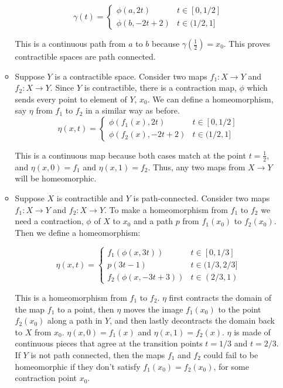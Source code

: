 \documentclass[12pt]{report}
\begin{document}
\begin{enumerate}
\begin{itemize}
  \[ \gamma(t) = \begin{cases}
  \phi(a,2t) & t \in [0,1/2] \\
  \phi(b,-2t+2) & t \in (1/2,1]
  \end{cases} \]

  This is a continuous path from $a$ to $b$ because $\gamma(\frac{1}{2}) = x_0$. This proves contractible spaces are
  path connected.

  \item Suppose $Y$ is a contractible space. Consider two maps $f_1: X \to Y$ and $f_2: X \to Y$. Since $Y$ is
  contractible, there is a contraction map, $\phi$ which sends every point to element of $Y$, $x_0$. We can define a
  homeomorphism, say $\eta$ from $f_1$ to $f_2$ in a similar way as before.
  \[ \eta(x,t) = \begin{cases}
  \phi(f_1(x),2t) & t \in [0,1/2] \\
  \phi(f_2(x),-2t+2) & t \in (1/2,1]
  \end{cases} \]

  This is a continuous map because both cases match at the point $t = \frac{1}{2}$, and $\eta(x,0) = f_1$ and
  $\eta(x,1) = f_2$. Thus, any two maps from $X \to Y$ will be homeomorphic.


  \item Suppose $X$ is contractible and $Y$ is path-connected. Consider two maps $f_1:X \to Y$ and $f_2:X \to Y$.
  To make a homeomorphism from $f_1$ to $f_2$ we need a contraction, $\phi$ of $X$ to $x_0$ and a path $p$ from
  $f_1(x_0)$ to $f_2(x_0)$. Then we define a homeomorphism:

  \[ \eta(x,t) = \begin{cases}
  f_1(\phi(x,3t)) & t \in [0,1/3] \\
  p(3t-1) & t \in (1/3, 2/3]\\
  f_2(\phi(x,-3t+3)) & t \in (2/3, 1)
  \end{cases} \]

  This is a homeomorphism from $f_1$ to $f_2$. $\eta$ first contracts the domain of the map $f_1$ to a point, then
  $\eta$ moves the image $f_1(x_0)$ to the point $f_2(x_0)$ along a path in $Y$, and then lastly decontracts the domain
  back to $X$ from $x_0$. $\eta(x,0) = f_1(x)$ and $\eta(x,1) = f_2(x)$. $\eta$ is made of continuous pieces that agree
  at the transition points $t=1/3$ and $t = 2/3$.\\

  If $Y$ is not path connected, then the maps $f_1$ and $f_2$ could fail to be homeomorphic if they don't satisfy
  $f_1(x_0) = f_2(x_0)$, for some contraction point $x_0$.
\end{itemize}


\end{enumerate}
\end{document}

